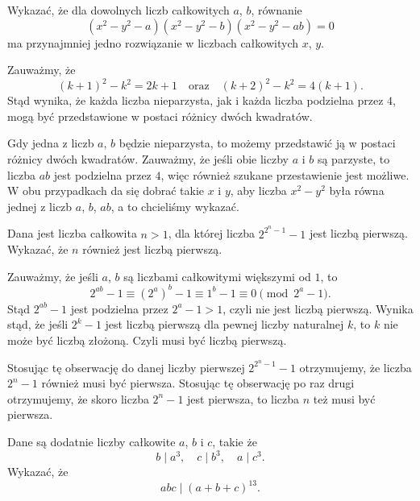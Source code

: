 \newpage
{}

\begin{problem}{1}
	Wykazać, że dla dowolnych liczb całkowitych $a$, $b$, równanie
	\[
		(x^2 - y^2 - a)(x^2 - y^2 - b)(x^2 - y^2 - ab) = 0
	\]
	ma przynajmniej jedno rozwiązanie w liczbach całkowitych $x$, $y$.
\end{problem}

\noindent
Zauważmy, że
\[
	(k + 1)^2 - k^2 = 2k + 1 \quad \text{oraz} \quad (k + 2)^2 - k^2 = 4(k + 1).
\]
Stąd wynika, że każda liczba nieparzysta, jak i każda liczba podzielna przez $4$, mogą być przedstawione w postaci różnicy dwóch kwadratów.

\vspace{10px}
\noindent
Gdy jedna z liczb $a$, $b$ będzie nieparzysta, to możemy przedstawić ją w postaci różnicy dwóch kwadratów. Zauważmy, że jeśli obie liczby $a$ i $b$ są parzyste, to liczba $ab$ jest podzielna przez $4$, więc również szukane przestawienie jest możliwe. W obu przypadkach da się dobrać takie $x$ i $y$, aby liczba $x^2 - y^2$ była równa jednej z liczb $a$, $b$, $ab$, a to chcieliśmy wykazać.

\vspace{5px}

\begin{problem}{2}
	Dana jest liczba całkowita $n > 1$, dla której liczba $2^{2^n - 1} - 1$ jest liczbą pierwszą. Wykazać, że $n$ również jest liczbą pierwszą.
\end{problem}

\noindent
Zauważmy, że jeśli $a$, $b$ są liczbami całkowitymi większymi od $1$, to
\[
	2^{ab} - 1 \equiv (2^a)^b - 1 \equiv 1^b - 1 \equiv 0 \pmod{2^a - 1}.
\]
Stąd $2^{ab} - 1$ jest podzielna przez $2^a - 1 > 1$, czyli nie jest liczbą pierwszą. Wynika stąd, że jeśli $2^k - 1$ jest liczbą pierwszą dla pewnej liczby naturalnej $k$, to $k$ nie może być liczbą złożoną. Czyli musi być liczbą pierwszą. 

\vspace{10px}
\noindent
Stosując tę obserwację do danej liczby pierwszej $2^{2^n - 1} - 1$ otrzymujemy, że liczba $2^n - 1$ również musi być pierwsza. Stosując tę obserwację po raz drugi otrzymujemy, że skoro liczba $2^n - 1$ jest pierwsza, to liczba $n$ też musi być pierwsza.

\vspace{10px}

\newpage

\begin{problem}{3}
	Dane są dodatnie liczby całkowite $a$, $b$ i $c$, takie że
	\[
		b \mid a^3, \quad c \mid b^3, \quad a \mid c^3.
	\]
	Wykazać, że
	\[
		abc \mid (a + b + c)^{13}.
	\]
\end{problem}

